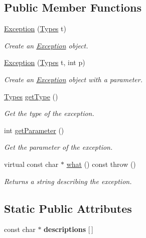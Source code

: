 \subsection*{Public Member Functions}
\begin{CompactItemize}
\item 
\hyperlink{classmprace_1_1Exception_a0}{Exception} (\hyperlink{classmprace_1_1Exception_w12}{Types} t)
\begin{CompactList}\small\item\em Create an \hyperlink{classmprace_1_1Exception}{Exception} object. \item\end{CompactList}\item 
\hyperlink{classmprace_1_1Exception_a1}{Exception} (\hyperlink{classmprace_1_1Exception_w12}{Types} t, int p)
\begin{CompactList}\small\item\em Create an \hyperlink{classmprace_1_1Exception}{Exception} object with a parameter. \item\end{CompactList}\item 
\hyperlink{classmprace_1_1Exception_w12}{Types} \hyperlink{classmprace_1_1Exception_a2}{get\-Type} ()
\begin{CompactList}\small\item\em Get the type of the exception. \item\end{CompactList}\item 
int \hyperlink{classmprace_1_1Exception_a3}{get\-Parameter} ()
\begin{CompactList}\small\item\em Get the parameter of the exception. \item\end{CompactList}\item 
\hypertarget{classmprace_1_1Exception_a4}{
virtual const char $\ast$ \hyperlink{classmprace_1_1Exception_a4}{what} () const   throw ()}
\label{classmprace_1_1Exception_a4}

\begin{CompactList}\small\item\em Returns a string describing the exception. \item\end{CompactList}\end{CompactItemize}
\subsection*{Static Public Attributes}
\begin{CompactItemize}
\item 
const char $\ast$ {\bf descriptions} \mbox{[}$\,$\mbox{]}
\end{CompactItemize}


